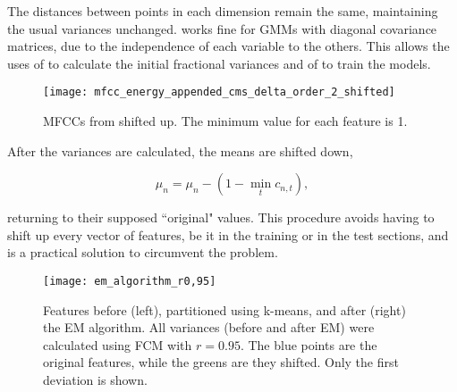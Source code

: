 \noindent The distances between points in each dimension remain the same, maintaining the usual variances unchanged.  works fine for GMMs with diagonal covariance matrices, due to the independence of each variable to the others. This allows the uses of  to calculate the initial fractional variances and of  to train the models.

\begin{figure}[ht]
    \centering
    \texttt{[image: mfcc\_energy\_appended\_cms\_delta\_order\_2\_shifted]}
    \caption{MFCCs from  shifted up. The minimum value for each feature is 1.}
    \label{fig:mfcc-shifted}
\end{figure}

\noindent After the variances are calculated, the means are shifted down,

\begin{equation}
    \mu_n = \mu_n - (1 - \min_t c_{n,t}),
    \label{eq:means-shift-down}
\end{equation}

\noindent returning to their supposed ``original" values. This procedure avoids having to shift up every vector of features, be it in the training or in the test sections, and is a practical solution to circumvent the problem.

\begin{figure}[ht]
    \centering
    \texttt{[image: em\_algorithm\_r0,95]}
    \caption{Features before (left), partitioned using k-means, and after (right) the EM algorithm. All variances (before and after EM) were calculated using FCM with $r = 0.95$. The blue points are the original features, while the greens are they shifted. Only the first deviation is shown.}
    \label{fig:frac-em_algorithm}
\end{figure}